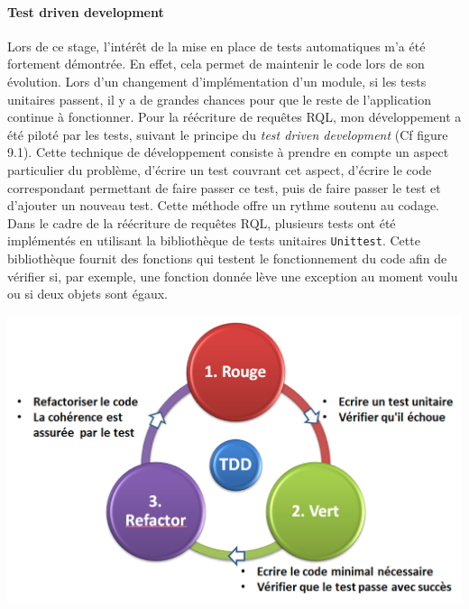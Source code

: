 \documentclass {report}
\begin{document}
\paragraph{Test driven development}
Lors de ce stage, l'intérêt de la mise en place de tests automatiques m'a été fortement démontrée. En effet, cela permet de maintenir le code lors de son évolution. Lors d’un changement d’implémentation d’un module, si les tests unitaires passent, il y a de grandes chances pour que le reste de l’application continue à fonctionner. Pour la réécriture de requêtes RQL, mon développement a été piloté par les tests, suivant le principe du \textit{test driven development} (Cf figure 9.1). Cette technique de développement consiste à prendre en compte un aspect particulier du problème, d'écrire un test couvrant cet aspect, d'écrire le code correspondant permettant de faire passer ce test, puis de faire passer le test et d'ajouter un nouveau test. Cette méthode offre un rythme soutenu au codage. Dans le cadre de la réécriture de requêtes RQL, plusieurs tests ont été implémentés en utilisant la bibliothèque de tests unitaires \verb+Unittest+. Cette bibliothèque fournit des fonctions qui testent le fonctionnement du code afin de vérifier si, par exemple, une fonction donnée lève une exception au moment voulu ou si deux objets sont égaux. 

\begin{center}
\includegraphics[scale=0.3]{tdd.png}
\end{center}
\end{document}

